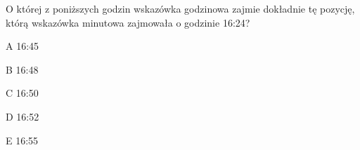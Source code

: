 \begin{tresc}
O której z poniższych godzin wskazówka godzinowa zajmie dokładnie tę pozycję, którą wskazówka minutowa zajmowała o godzinie 16:24?
\end{tresc}
\begin{wariant}{A} 16:45 \end{wariant}
\begin{wariant}{B} 16:48 \end{wariant}
\begin{wariant}{C} 16:50 \end{wariant}
\begin{wariant}{D} 16:52 \end{wariant}
\begin{wariant}{E} 16:55 \end{wariant}
